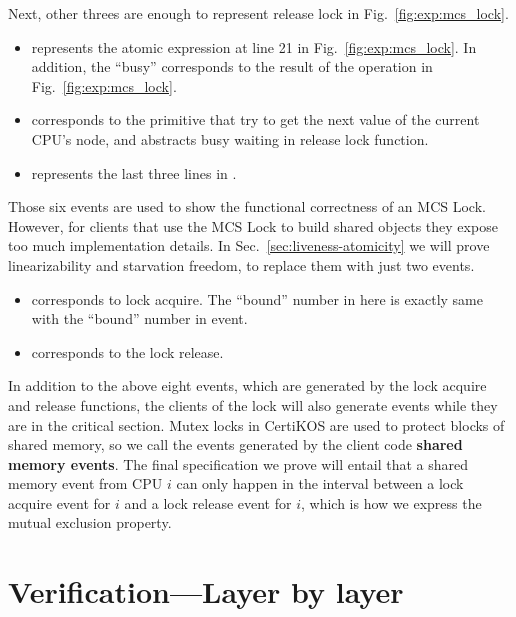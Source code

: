 Next, other threes are enough to represent release lock in Fig.~\ref{fig:exp:mcs_lock}.

\begin{itemize}

\item \textbf{} represents the atomic expression at line 21  in Fig.~\ref{fig:exp:mcs_lock}. 
In addition, the ``busy'' corresponds to the result of the  operation in Fig.~\ref{fig:exp:mcs_lock}.

\item  \textbf{\getnext} corresponds to the primitive that try to get the next value of the current CPU's node, and abstracts busy waiting in release lock function.

\item  \textbf{\setbusy} represents the last three lines in .
\end{itemize}

Those six events are used to show the functional correctness of
an MCS Lock. However, for clients that use the MCS Lock to build shared
objects they expose too much implementation details.
In Sec.~\ref{sec:liveness-atomicity} we will prove linearizability and
starvation freedom,  to replace them
with just two events.


\begin{itemize} 
\item \textbf{} corresponds to lock acquire. The ``bound'' number in here is exactly same with the ``bound'' number in  event.

\item \textbf{\rellock} corresponds to the lock release.
\end{itemize}

In addition to the above eight events, which are generated by the lock
acquire and release functions, the clients of the lock will also
generate events while they are in the critical section. Mutex locks in
CertiKOS are used to protect blocks of shared memory, so we call the
events generated by the client code \textbf{shared memory events}. The
final specification we prove will entail that a shared memory event
from CPU $i$ can only happen in the interval between a lock acquire
event for $i$ and a lock release event for $i$, which is how we
express the mutual exclusion property.

\section{Verification---Layer by layer}
\label{sec:verification}%

